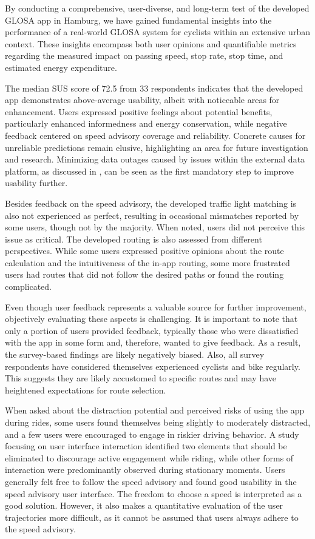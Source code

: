 \begin{Summary}
By conducting a comprehensive, user-diverse, and long-term test of the developed GLOSA app in Hamburg, we have gained fundamental insights into the performance of a real-world GLOSA system for cyclists within an extensive urban context. These insights encompass both user opinions and quantifiable metrics regarding the measured impact on passing speed, stop rate, stop time, and estimated energy expenditure.

The median SUS score of 72.5 from 33 respondents indicates that the developed app demonstrates above-average usability, albeit with noticeable areas for enhancement. Users expressed positive feelings about potential benefits, particularly enhanced informedness and energy conservation, while negative feedback centered on speed advisory coverage and reliability. Concrete causes for unreliable predictions remain elusive, highlighting an area for future investigation and research. Minimizing data outages caused by issues within the external data platform, as discussed in , can be seen as the first mandatory step to improve usability further. 

Besides feedback on the speed advisory, the developed traffic light matching is also not experienced as perfect, resulting in occasional mismatches reported by some users, though not by the majority. When noted, users did not perceive this issue as critical. The developed routing is also assessed from different perspectives. While some users expressed positive opinions about the route calculation and the intuitiveness of the in-app routing, some more frustrated users had routes that did not follow the desired paths or found the routing complicated. 

Even though user feedback represents a valuable source for further improvement, objectively evaluating these aspects is challenging. It is important to note that only a portion of users provided feedback, typically those who were dissatisfied with the app in some form and, therefore, wanted to give feedback. As a result, the survey-based findings are likely negatively biased. Also, all survey respondents have considered themselves experienced cyclists and bike regularly. This suggests they are likely accustomed to specific routes and may have heightened expectations for route selection.

When asked about the distraction potential and perceived risks of using the app during rides, some users found themselves being slightly to moderately distracted, and a few users were encouraged to engage in riskier driving behavior. A study focusing on user interface interaction identified two elements that should be eliminated to discourage active engagement while riding, while other forms of interaction were predominantly observed during stationary moments. Users generally felt free to follow the speed advisory and found good usability in the speed advisory user interface. The freedom to choose a speed is interpreted as a good solution. However, it also makes a quantitative evaluation of the user trajectories more difficult, as it cannot be assumed that users always adhere to the speed advisory.


\end{Summary}

